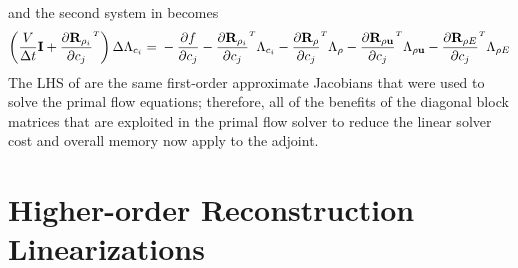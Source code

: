 and the second system in  becomes
\begin{equation}
  \left( \frac{V}{\Delta t} \mi + \rtdiff{\rho_i}{c_j} \right) \Delta
  \adjlam{c_i}
  = \\ -\pd{f}{c_j}
  - \rtdiff{\rho_i}{c_j} \adjlam{c_i}
  - \rtdiff{\rho}{c_j} \adjlam{\rho}
  - \rtdiff{\rho \vu}{c_j} \adjlam{\rho \vu}
  - \rtdiff{\rho E}{c_j} \adjlam{\rho E}
  \label{adj-dc-time2}
\end{equation}
The LHS of  are the same first-order
approximate Jacobians that were used to solve the primal flow equations;
therefore, all of the benefits of the diagonal block matrices that are
exploited in the primal flow solver to reduce the linear solver cost and overall
memory now apply to the adjoint.

\section{Higher-order Reconstruction Linearizations}

